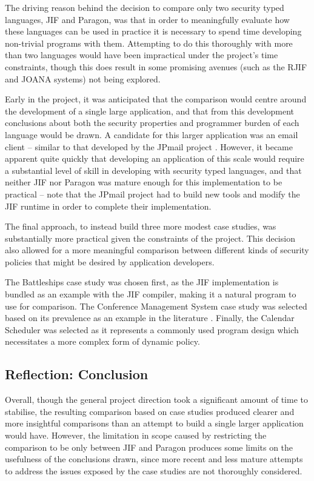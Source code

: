 The driving reason behind the decision to compare only two security typed languages, JIF and Paragon, was that in order to meaningfully evaluate how these languages can be used in practice it is necessary to spend time developing non-trivial programs with them. Attempting to do this thoroughly with more than two languages would have been impractical under the project's time constraints, though this does result in some promising avenues (such as the RJIF \cite{kozyri2016jrif} and JOANA \cite{graf2013joana} systems) not being explored.

Early in the project, it was anticipated that the comparison would centre around the development of a single large application, and that from this development conclusions about both the security properties and programmer burden of each language would be drawn. A candidate for this larger application was an email client -- similar to that developed by the JPmail project \cite{jpmailpage}. However, it became apparent quite quickly that developing an application of this scale would require a substantial level of skill in developing with security typed languages, and that neither JIF nor Paragon was mature enough for this implementation to be practical -- note that the JPmail project had to build new tools and modify the JIF runtime in order to complete their implementation.

The final approach, to instead build three more modest case studies, was substantially more practical given the constraints of the project. This decision also allowed for a more meaningful comparison between different kinds of security policies that might be desired by application developers.

The Battleships case study was chosen first, as the JIF implementation is bundled as an example with the JIF compiler, making it a natural program to use for comparison. The Conference Management System case study was selected based on its prevalence as an example in the literature \cite{agrawal2016edas_conf}\cite{polikarpova2016lifty}. Finally, the Calendar Scheduler was selected as it represents a commonly used program design which necessitates a more complex form of dynamic policy.

\clearpage

\subsection{Reflection: Conclusion}

Overall, though the general project direction took a significant amount of time to stabilise, the resulting comparison based on case studies produced clearer and more insightful comparisons than an attempt to build a single larger application would have. However, the limitation in scope caused by restricting the comparison to be only between JIF and Paragon produces some limits on the usefulness of the conclusions drawn, since more recent and less mature attempts to address the issues exposed by the case studies are not thoroughly considered.

